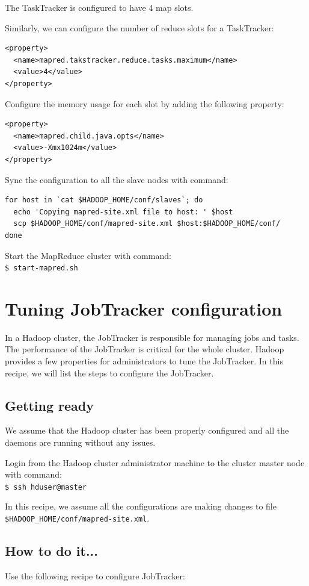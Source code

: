 The TaskTracker is configured to have 4 map slots.

Similarly, we can configure the number of reduce slots for a TaskTracker:
\lstset{style=bashstyle}
\begin{lstlisting}
<property>
  <name>mapred.takstracker.reduce.tasks.maximum</name>
  <value>4</value>
</property>
\end{lstlisting}

Configure the memory usage for each slot by adding the following property:
\lstset{style=bashstyle}
\begin{lstlisting}
<property>
  <name>mapred.child.java.opts</name>
  <value>-Xmx1024m</value>
</property>
\end{lstlisting}

Sync the configuration to all the slave nodes with command:
\lstset{style=bashstyle}
\begin{lstlisting}
for host in `cat $HADOOP_HOME/conf/slaves`; do
  echo 'Copying mapred-site.xml file to host: ' $host
  scp $HADOOP_HOME/conf/mapred-site.xml $host:$HADOOP_HOME/conf/
done
\end{lstlisting}

Start the MapReduce cluster with command: \\
\verb|$ start-mapred.sh|

\section{Tuning JobTracker configuration}
In a Hadoop cluster, the JobTracker is responsible for managing jobs and tasks. The performance of the JobTracker is critical for the whole cluster. Hadoop provides a few properties for administrators to tune the JobTracker. In this recipe, we will list the steps to configure the JobTracker.
\subsection*{Getting ready}
We assume that the Hadoop cluster has been properly configured and all the daemons are running without any issues.

Login from the Hadoop cluster administrator machine to the cluster master node with command:\\
\verb|$ ssh hduser@master|

In this recipe, we assume all the configurations are making changes to file \verb|$HADOOP_HOME/conf/mapred-site.xml|.
\subsection*{How to do it...}
Use the following recipe to configure JobTracker:


